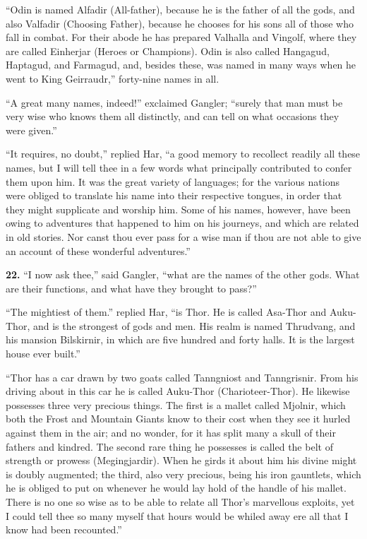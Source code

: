 ``Odin is named Alfadir (All-father), because he is the father of all
the gods, and also Valfadir (Choosing Father), because he chooses for
his sons all of those who fall in combat. For their abode he has
prepared Valhalla and Vingolf, where they are called Einherjar (Heroes
or Champions). Odin is also called Hangagud, Haptagud, and Farmagud,
and, besides these, was named in many ways when he went to King
Geirraudr,'' forty-nine names in all.

``A great many names, indeed!'' exclaimed Gangler; ``surely that man must
be very wise who knows them all distinctly, and can tell on what
occasions they were given.''

``It requires, no doubt,'' replied Har, ``a good memory to recollect
readily all these names, but I will tell thee in a few words what
principally contributed to confer them upon him. It was the great
variety of languages; for the various nations were obliged to
translate his name into their respective tongues, in order that they
might supplicate and worship him. Some of his names, however, have
been owing to adventures that happened to him on his journeys, and
which are related in old stories. Nor canst thou ever pass for a wise
man if thou are not able to give an account of these wonderful
adventures.''


\textbf{22.} ``I now ask thee,'' said Gangler, ``what are the names of the other
gods. What are their functions, and what have they brought to pass?''

``The mightiest of them.'' replied Har, ``is Thor. He is called Asa-Thor
and Auku-Thor, and is the strongest of gods and men. His realm is
named Thrudvang, and his mansion Bilskirnir, in which are five hundred
and forty halls. It is the largest house ever built.''

``Thor has a car drawn by two goats called Tanngniost and Tanngrisnir.
From his driving about in this car he is called Auku-Thor
(Charioteer-Thor). He likewise possesses three very precious things.
The first is a mallet called Mjolnir, which both the Frost and
Mountain Giants know to their cost when they see it hurled against
them in the air; and no wonder, for it has split many a skull of their
fathers and kindred. The second rare thing he possesses is called the
belt of strength or prowess (Megingjardir). When he girds it about
him his divine might is doubly augmented; the third, also very
precious, being his iron gauntlets, which he is obliged to put on
whenever he would lay hold of the handle of his mallet. There is no
one so wise as to be able to relate all Thor's marvellous exploits,
yet I could tell thee so many myself that hours would be whiled away
ere all that I know had been recounted.''

